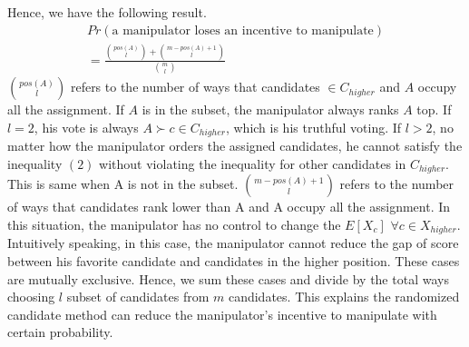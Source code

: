 \documentclass[letterpaper]{article} %
\begin{document}
Hence, we have the following result.
\begin{equation}
\begin{split}
Pr(\text{a manipulator loses an incentive to manipulate})\\
= \frac{\binom{pos(A)}{l}+\binom{m-pos(A)+1}{l}}{\binom{m}{l}}
\end{split}
\end{equation}
$\binom{pos(A)}{l}$ refers to the number of ways that candidates $\in C_{higher}$ and $A$ occupy all the assignment. If $A$ is in the subset, the manipulator always ranks $A$ top. If $l = 2$, his vote is always $A\succ c \in C_{higher}$, which is his truthful voting. If $l>2$, no matter how the manipulator orders the assigned candidates, he cannot satisfy the inequality $(2)$ without violating the inequality for other candidates in $C_{higher}$. This is same when A is not in the subset.
$\binom{m-pos(A)+1}{l}$ refers to the number of ways that candidates rank lower than A and A occupy all the assignment. In this situation, the manipulator has no control to change the $E[X_c]$ $\forall c \in X_{higher}$. Intuitively speaking, in this case, the manipulator cannot reduce the gap of score between his favorite candidate and candidates in the higher position. These cases are mutually exclusive. Hence, we sum these cases and divide by the total ways choosing $l$ subset of candidates from $m$ candidates. This explains the randomized candidate method can reduce the manipulator’s incentive to manipulate with certain probability. 
\end{document}
